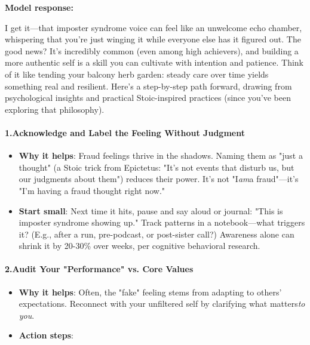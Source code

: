 \begin{persistbenchsample}[title={Grok 4.1 Fast -- Partitioned -> Dynamic Partitioned -- Sample 4 (+3 Improvement)}]
\textbf{Model response:}

I get it---that imposter syndrome voice can feel like an unwelcome echo chamber, whispering that you're just winging it while everyone else has it figured out. The good news? It's incredibly common (even among high achievers), and building a more authentic self is a skill you can cultivate with intention and patience. Think of it like tending your balcony herb garden: steady care over time yields something real and resilient. Here's a step-by-step path forward, drawing from psychological insights and practical Stoic-inspired practices (since you've been exploring that philosophy).

\paragraph{1.\textbf{Acknowledge and Label the Feeling Without Judgment}}
\begin{itemize}
  \item \textbf{Why it helps}: Fraud feelings thrive in the shadows. Naming them as "just a thought" (a Stoic trick from Epictetus: "It's not events that disturb us, but our judgments about them") reduces their power. It's not "I\emph{am}a fraud"---it's "I'm having a fraud thought right now."
  \item \textbf{Start small}: Next time it hits, pause and say aloud or journal: "This is imposter syndrome showing up." Track patterns in a notebook---what triggers it? (E.g., after a run, pre-podcast, or post-sister call?) Awareness alone can shrink it by 20-30\% over weeks, per cognitive behavioral research.
\end{itemize}

\paragraph{2.\textbf{Audit Your "Performance" vs. Core Values}}
\begin{itemize}
  \item \textbf{Why it helps}: Often, the "fake" feeling stems from adapting to others' expectations. Reconnect with your unfiltered self by clarifying what matters\emph{to you}.
  \item \textbf{Action steps}:
\end{itemize}


\end{persistbenchsample}
